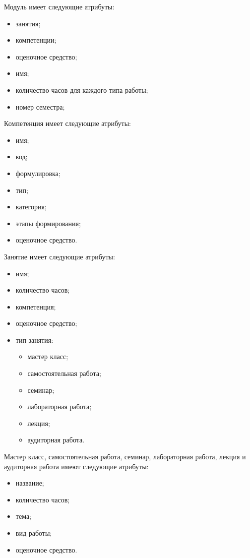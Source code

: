 Модуль имеет следующие атрибуты:
\begin{itemize}
	\item занятия;
	\item компетенции;
	\item оценочное средство;
	\item имя;
	\item количество часов для каждого типа работы;
	\item номер семестра;
\end{itemize}


Компетенция имеет следующие атрибуты:
\begin{itemize}
	\item имя;
	\item код;
	\item формулировка;
	\item тип;
	\item категория;
	\item этапы формирования;
	\item оценочное средство.
\end{itemize}

\clearpage

Занятие имеет следующие атрибуты:
\begin{itemize}
	\item имя;
	\item количество часов;
	\item компетенция;
	\item оценочное средство;
	\item тип занятия:
	\begin{itemize}
		\item мастер класс;
		\item самостоятельная работа;
		\item семинар;
		\item лабораторная работа;
		\item лекция;
		\item аудиторная работа.
	\end{itemize}
\end{itemize}

Мастер класс, самостоятельная работа, семинар, лабораторная работа, лекция и аудиторная работа имеют следующие атрибуты:
\begin{itemize}
	\item название;
	\item количество часов;
	\item тема;
	\item вид работы;
	\item оценочное средство.
\end{itemize}
